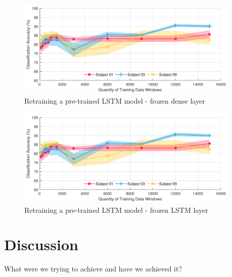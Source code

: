 
\begin{figure}[htbp]
    \centering
    \includegraphics[width=0.95\textwidth]{content/5-Personalisation/ch5_frozen_dense_layer_accuracy.pdf}
    \caption[Retraining a pre-trained LSTM model]{Retraining a pre-trained LSTM model - frozen dense layer}
    \label{fig:ch5_freezing_dense_layer}
\end{figure}


\begin{figure}[htbp]
    \centering
    \includegraphics[width=0.95\textwidth]{content/5-Personalisation/ch5_frozen_lstm_layer_accuracy.pdf}
    \caption[Retraining a pre-trained LSTM model]{Retraining a pre-trained LSTM model - frozen LSTM layer}
    \label{fig:ch5_freezing_LSTM_layer}
\end{figure}

\section{Discussion}
What were we trying to achieve and have we achieved it?

